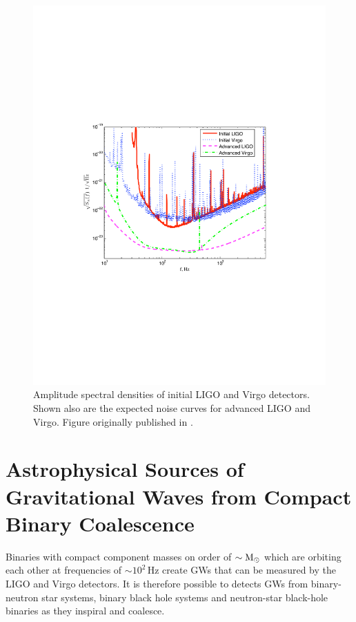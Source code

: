 \begin{figure}[p]
\center
\includegraphics[width=6in]{figures/NoiseCurvesInitAdv.pdf}
\caption{Amplitude spectral densities of initial LIGO and Virgo detectors. Shown also are the expected noise curves for advanced LIGO and Virgo. Figure originally published in \cite{ratesdoc}.}
\label{fig:init_AdvASD}
\end{figure}

\section{Astrophysical Sources of Gravitational Waves from Compact Binary Coalescence}

Binaries with compact component masses on order of $\sim \mathrm{M_\odot}$ which are orbiting each other at frequencies of $\sim 10^2\,$Hz create \acp{GW} that can be measured by the \ac{LIGO} and Virgo detectors. It is therefore possible to detects \acp{GW} from binary-neutron star systems, binary black hole systems and neutron-star black-hole binaries as they inspiral and coalesce.

